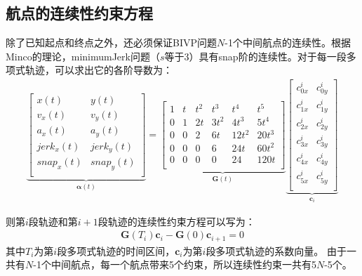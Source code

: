 \documentclass[master,academic]{ysuthesis} %
\begin{document}
		\subsection{航点的连续性约束方程} 
		除了已知起点和终点之外，还必须保证BIVP问题$N$-1个中间航点的连续性。根据Minco的理论，minimumJerk问题（$s$等于3）具有snap阶的连续性。对于每一段多项式轨迹，可以求出它的各阶导数为：
		\begin{equation}
			\begin{aligned}
				\underbrace{\begin{bmatrix}
					x(t)& y(t)\\
					v_x(t)& v_y(t)\\
					a_x(t)& a_y(t)\\
					jerk_x(t)& jerk_y(t)\\
					snap_x(t)& snap_y(t)\\
				\end{bmatrix}}_{\bm{\alpha}(t) }
					= \underbrace{\begin{bmatrix}
						1&		t&		t^2&		t^3&		t^4&		t^5\\
						0&		1&		2t&		3t^2&		4t^3&		5t^4\\
						0&		0&		2&		6t&		12t^2&		20t^3\\
						0&		0&		0&		6&		24t&		60t^2\\
						0&		0&		0&		0&		24&		120t\\
					\end{bmatrix}}_{\bm{G}(t)}
					  \underbrace{\begin{bmatrix}
						c_{0x}^{i}&		c_{0y}^{i}\\
						c_{1x}^{i}&		c_{1y}^{i}\\
						c_{2x}^{i}&		c_{2y}^{i}\\
						c_{3x}^{i}&		c_{3y}^{i}\\
						c_{4x}^{i}&		c_{4y}^{i}\\
						c_{5x}^{i}&		c_{5y}^{i}\\
					\end{bmatrix}}_{\bm{c}_i}
			\end{aligned}
		\end{equation}
		
		则第$i$段轨迹和第$i+1$段轨迹的连续性约束方程可以写为：
		\begin{equation}
			\begin{aligned}
				\bm{G}(T_i)\bm{c}_i-\bm{G}(0)\bm{c}_{i+1} = 0
			\end{aligned}
		\end{equation}
		其中$T_i$为第$i$段多项式轨迹的时间区间，$\bm{c}_i$为第$i$段多项式轨迹的系数向量。
		由于一共有$N$-1个中间航点，每一个航点带来5个约束，所以连续性约束一共有5$N$-5个。
		
\end{document}
